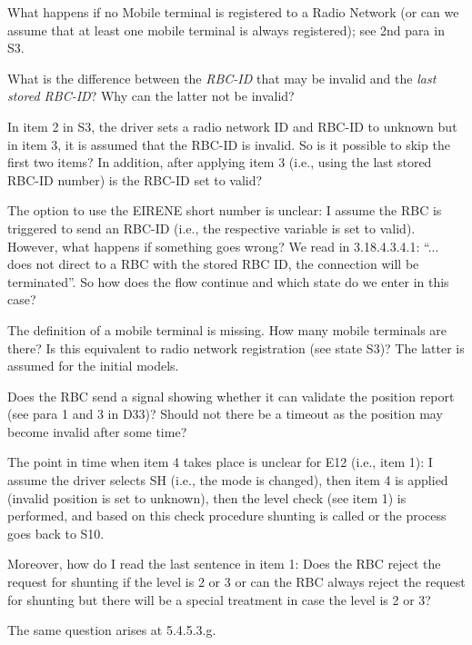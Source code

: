 \documentclass{template/openetcs_article}
\begin{document}
What happens if no Mobile terminal is registered to a Radio Network (or can we assume that at least one mobile terminal is always registered); see 2nd para in S3.

What is the difference between the \emph{RBC-ID} that may be invalid and the \emph{last stored RBC-ID}? Why can the latter not be invalid?

In item 2 in S3, the driver sets a radio network ID and RBC-ID to unknown but in item 3, it is assumed that the RBC-ID is invalid. So is it possible to skip the first two items? In addition, after applying item 3 (i.e., using the last stored RBC-ID number) is the RBC-ID set to valid?

The option to use the EIRENE short number is unclear: I assume the RBC is triggered to send an RBC-ID (i.e., the respective variable is set to valid). However, what happens if something goes wrong? We read in 3.18.4.3.4.1:  ``... does not direct to a RBC with the stored RBC ID, the connection will be terminated''. So how does the flow continue and which state do we enter in this case?

The definition of a mobile terminal is missing. How many mobile terminals are there? Is this equivalent to radio network registration (see state S3)? The latter is assumed for the initial models.

Does the RBC send a signal showing whether it can validate the position report (see para 1 and 3 in D33)? Should not there be a timeout as the position may become invalid after some time?

\label{i:s10}
The point in time when item 4 takes place is unclear for E12 (i.e., item 1): I assume the driver selects SH (i.e., the mode is changed), then item 4 is applied (invalid position is set to unknown), then the level check (see item 1) is performed, and based on this check procedure shunting is called or the process goes back to S10. 

Moreover, how do I read the last sentence in item 1: Does the RBC reject the request for shunting if the level is 2 or 3 or can the RBC always reject the request for shunting but there will be a special treatment in case the level is 2 or 3? 

The same question arises at 5.4.5.3.g.
\end{document}
